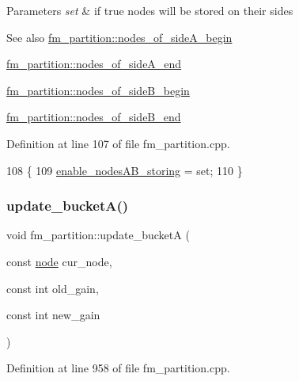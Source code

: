 \begin{DoxyParams}{Parameters}
{\em set} & if {\ttfamily true} nodes will be stored on their sides \\
\hline
\end{DoxyParams}
\begin{DoxySeeAlso}{See also}
\mbox{\hyperlink{classfm__partition_adad3bf33efb4a2b1b0feadeafb33f5fd}{fm\+\_\+partition\+::nodes\+\_\+of\+\_\+side\+A\+\_\+begin}} 

\mbox{\hyperlink{classfm__partition_ac4202d1d929c1700985ad5d452b735fb}{fm\+\_\+partition\+::nodes\+\_\+of\+\_\+side\+A\+\_\+end}} 

\mbox{\hyperlink{classfm__partition_a4e433456ed0214c04466c4f1060b0909}{fm\+\_\+partition\+::nodes\+\_\+of\+\_\+side\+B\+\_\+begin}} 

\mbox{\hyperlink{classfm__partition_a9682b070cce104bdfe69e576df57f560}{fm\+\_\+partition\+::nodes\+\_\+of\+\_\+side\+B\+\_\+end}} 
\end{DoxySeeAlso}


Definition at line 107 of file fm\+\_\+partition.\+cpp.


\begin{DoxyCode}
108 \{
109     \mbox{\hyperlink{classfm__partition_a2e308857dde9405bc3c6b911218bcda1}{enable\_nodesAB\_storing}} = \textcolor{keyword}{set};
110 \}
\end{DoxyCode}
\mbox{\label{classfm__partition_aa4ec83c52916cc6cac23e7a9987427cd}} 
\subsubsection{\texorpdfstring{update\+\_\+bucket\+A()}{update\_bucketA()}}
{\footnotesize\ttfamily void fm\+\_\+partition\+::update\+\_\+bucketA (\begin{DoxyParamCaption}\item[{const \mbox{\hyperlink{classnode}{node}}}]{cur\+\_\+node,  }\item[{const int}]{old\+\_\+gain,  }\item[{const int}]{new\+\_\+gain }\end{DoxyParamCaption})\hspace{0.3cm}{\ttfamily [protected]}}



Definition at line 958 of file fm\+\_\+partition.\+cpp.


